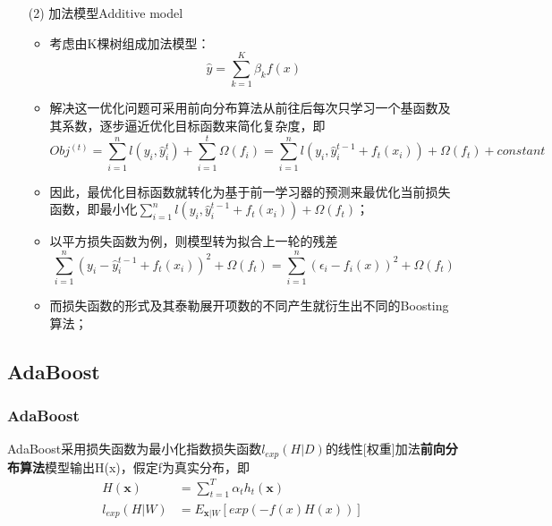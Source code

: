 \documentclass[a4paper]{article}
\begin{document}
\begin{itemize}
		\item[(2)] 加法模型Additive model
			\begin{itemize}
				\item 考虑由K棵树组成加法模型：$$\hat{y} = \sum_{k=1}^{K}\beta_{k}f(x)$$
				\item 解决这一优化问题可采用前向分布算法从前往后每次只学习一个基函数及其系数，逐步逼近优化目标函数来简化复杂度，即
				$$Obj^{(t)} = \sum_{i=1}^{n}l(y_i, \hat{y}_i^t)+\sum_{i=1}^{t}\Omega(f_i) = \sum_{i=1}^{n}l(y_i, \hat{y}_{i}^{t-1}+f_t(x_i))+\Omega(f_t)+constant$$
				\item 因此，最优化目标函数就转化为基于前一学习器的预测来最优化当前损失函数，即最小化$\sum_{i=1}^{n}l(y_i, \hat{y}_{i}^{t-1}+f_t(x_i))+\Omega(f_t)$；
				\item 以平方损失函数为例，则模型转为拟合上一轮的残差$$\sum_{i=1}^{n}(y_i-\hat{y}_{i}^{t-1}+f_t(x_i))^2+\Omega(f_t) = \sum_{i=1}^{n}(\epsilon_i - f_i(x))^2 + \Omega(f_t)$$
				\item 而损失函数的形式及其泰勒展开项数的不同产生就衍生出不同的Boosting算法；
			\end{itemize}
	\end{itemize}
	\subsection{AdaBoost}
		\subsubsection{AdaBoost}
			AdaBoost采用损失函数为最小化指数损失函数$l_{exp}(H|D)$的线性[权重]加法\textbf{前向分布算法}模型输出H(x)，假定f为真实分布，即
				\begin{align*}
					H(\textbf{x}) & = \sum_{t=1}^{T}\alpha_th_t(\textbf{x})\\
			   		l_{exp}(H|W)& = E_{\textbf{x}|W}[exp(-f(x)H(x))]
				\end{align*}
\end{document}

